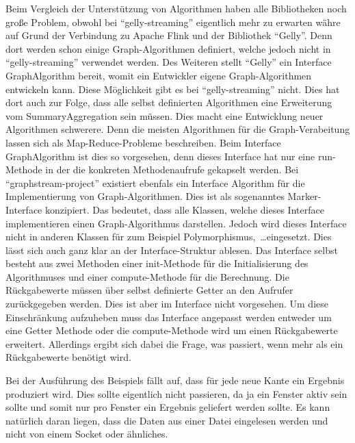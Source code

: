 Beim Vergleich der Unterstützung von Algorithmen haben alle Bibliotheken noch
große Problem, obwohl bei \enquote{gelly-streaming} eigentlich mehr zu erwarten
währe auf Grund der Verbindung zu Apache Flink und der Bibliothek \enquote{Gelly}.
Denn dort werden schon einige Graph-Algorithmen definiert, welche jedoch nicht in
\enquote{gelly-streaming} verwendet werden. Des Weiteren stellt \enquote{Gelly}
ein Interface GraphAlgorithm bereit, womit ein Entwickler eigene Graph-Algorithmen
entwickeln kann. Diese Möglichkeit gibt es bei \enquote{gelly-streaming} nicht.
Dies hat dort auch zur Folge, dass alle selbst definierten Algorithmen eine
Erweiterung vom SummaryAggregation sein müssen. Dies macht eine Entwicklung
neuer Algorithmen schwerere. Denn die meisten Algorithmen für die
Graph-Verabeitung lassen sich als Map-Reduce-Probleme beschreiben. Beim Interface
GraphAlgorithm ist dies so vorgesehen, denn dieses Interface hat nur eine
run-Methode in der die konkreten Methodenaufrufe gekapselt werden. Bei
\enquote{graphstream-project} existiert ebenfals ein Interface Algorithm für die
Implementierung von Graph-Algorithmen. Dies ist als sogenanntes Marker-Interface
konzipiert. Das bedeutet, dass alle Klassen, welche dieses Interface
implementieren einen Graph-Algorithmus darstellen. Jedoch wird dieses Interface
nicht in anderen Klassen für zum Beispiel Polymorphismus,~\dots eingesetzt. Dies
lässt sich auch ganz klar an der Interface-Struktur ablesen. Das Interface selbst
besteht aus zwei Methoden einer init-Methode für die Initialisierung des
Algorithmuses und einer compute-Methode für die Berechnung. Die Rückgabewerte
müssen über selbst definierte Getter an den Aufrufer zurückgegeben werden. Dies
ist aber im Interface nicht vorgesehen. Um diese Einschränkung aufzuheben muss
das Interface angepasst werden entweder um eine Getter Methode oder die
compute-Methode wird um einen Rückgabewerte erweitert. Allerdings ergibt sich
dabei die Frage, was passiert, wenn mehr als ein Rückgabewerte benötigt wird.







Bei der Ausführung des Beispiels fällt auf, dass für jede neue Kante ein
Ergebnis produziert wird. Dies sollte eigentlich nicht passieren, da ja ein
Fenster aktiv sein sollte und somit nur pro Fenster ein Ergebnis geliefert
werden sollte. Es kann natürlich daran liegen, dass die Daten aus einer Datei
eingelesen werden und nicht von einem Socket oder ähnliches.

